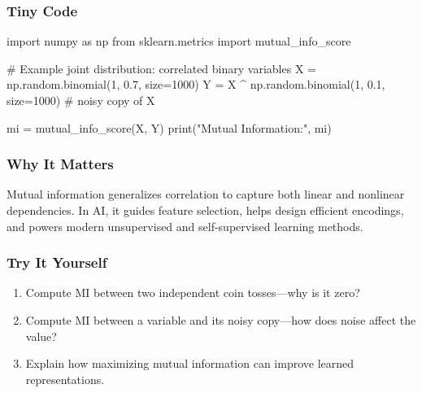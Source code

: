\documentclass[
  letterpaper,
  DIV=11,
  numbers=noendperiod]{scrreprt}
\newenvironment{Shaded}{\begin{snugshade}}{\end{snugshade}}
\newcommand{\BuiltInTok}[1]{\textcolor[rgb]{0.00,0.23,0.31}{#1}}
\newcommand{\CommentTok}[1]{\textcolor[rgb]{0.37,0.37,0.37}{#1}}
\newcommand{\DecValTok}[1]{\textcolor[rgb]{0.68,0.00,0.00}{#1}}
\newcommand{\FloatTok}[1]{\textcolor[rgb]{0.68,0.00,0.00}{#1}}
\newcommand{\ImportTok}[1]{\textcolor[rgb]{0.00,0.46,0.62}{#1}}
\newcommand{\NormalTok}[1]{\textcolor[rgb]{0.00,0.23,0.31}{#1}}
\newcommand{\OperatorTok}[1]{\textcolor[rgb]{0.37,0.37,0.37}{#1}}
\newcommand{\StringTok}[1]{\textcolor[rgb]{0.13,0.47,0.30}{#1}}
\providecommand{\tightlist}{%
  \setlength{\itemsep}{0pt}\setlength{\parskip}{0pt}}
\begin{document}
\subsubsection{Tiny Code}\label{tiny-code-162}

\begin{Shaded}
\begin{Highlighting}[]
\ImportTok{import}\NormalTok{ numpy }\ImportTok{as}\NormalTok{ np}
\ImportTok{from}\NormalTok{ sklearn.metrics }\ImportTok{import}\NormalTok{ mutual\_info\_score}

\CommentTok{\# Example joint distribution: correlated binary variables}
\NormalTok{X }\OperatorTok{=}\NormalTok{ np.random.binomial(}\DecValTok{1}\NormalTok{, }\FloatTok{0.7}\NormalTok{, size}\OperatorTok{=}\DecValTok{1000}\NormalTok{)}
\NormalTok{Y }\OperatorTok{=}\NormalTok{ X }\OperatorTok{\^{}}\NormalTok{ np.random.binomial(}\DecValTok{1}\NormalTok{, }\FloatTok{0.1}\NormalTok{, size}\OperatorTok{=}\DecValTok{1000}\NormalTok{)  }\CommentTok{\# noisy copy of X}

\NormalTok{mi }\OperatorTok{=}\NormalTok{ mutual\_info\_score(X, Y)}
\BuiltInTok{print}\NormalTok{(}\StringTok{"Mutual Information:"}\NormalTok{, mi)}
\end{Highlighting}
\end{Shaded}

\subsubsection{Why It Matters}\label{why-it-matters-60}

Mutual information generalizes correlation to capture both linear and
nonlinear dependencies. In AI, it guides feature selection, helps design
efficient encodings, and powers modern unsupervised and self-supervised
learning methods.

\subsubsection{Try It Yourself}\label{try-it-yourself-162}

\begin{enumerate}
\def\labelenumi{\arabic{enumi}.}
\tightlist
\item
  Compute MI between two independent coin tosses---why is it zero?
\item
  Compute MI between a variable and its noisy copy---how does noise
  affect the value?
\item
  Explain how maximizing mutual information can improve learned
  representations.
\end{enumerate}
\end{document}
